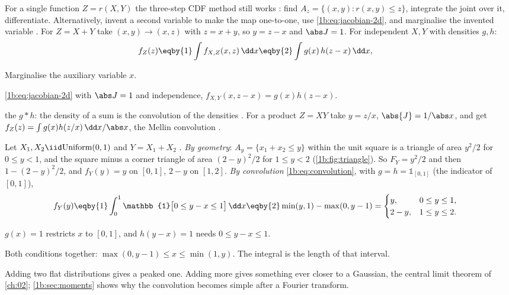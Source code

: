 For a single function $Z=r(X,Y)$ the three-step CDF method still works
: find $A_z=\{(x,y):r(x,y)\le z\}$, integrate the joint over
it, differentiate. Alternatively, invent a second variable to make the map
one-to-one, use \eqref{1b:eq:jacobian-2d}, and marginalise the invented
variable . For $Z=X+Y$ take $(x,y)\to(x,z)$ with
$z=x+y$, so $y=z-x$ and $\abs J=1$. For independent $X,Y$ with densities $g,h$:
\begin{align}
  f_Z(z)
  &\eqby{1} \int f_{X,Z}(x,z)\,\dd x
   \eqby{2} \int g(x)\,h(z-x)\,\dd x ,
  \label{1b:eq:convolution}
\end{align}
\begin{explain}
  \item Marginalise the auxiliary variable $x$.
  \item \eqref{1b:eq:jacobian-2d} with $\abs J=1$ and independence,
        $f_{X,Y}(x,z-x)=g(x)h(z-x)$.
\end{explain}
the  $g*h$: the density of a sum is the convolution of
the densities . For a product $Z=XY$ take $y=z/x$,
$\abs{J}=1/\abs x$, and get $f_Z(z)=\int g(x)h(z/x)\,\dd x/\abs x$, the Mellin
convolution .

\label{1b:ex:triangle}
Let $X_1,X_2\iid\text{Uniform}(0,1)$ and $Y=X_1+X_2$
. \emph{By geometry}: $A_y=\{x_1+x_2\le y\}$ within
the unit square is a triangle of area $y^2/2$ for $0\le y<1$, and the square
minus a corner triangle of area $(2-y)^2/2$ for $1\le y<2$
(\cref{1b:fig:triangle}). So $F_Y=y^2/2$ and then $1-(2-y)^2/2$, and
$f_Y(y)=y$ on $[0,1]$, $2-y$ on $[1,2]$. \emph{By convolution}
\eqref{1b:eq:convolution}, with $g=h=\mathbb{1}_{[0,1]}$ (the indicator of
$[0,1]$),
\begin{align*}
  f_Y(y)
  &\eqby{1} \int_0^1\mathbb{1}\bigl[0\le y-x\le1\bigr]\,\dd x
   \eqby{2} \min(y,1)-\max(0,y-1)
   = \begin{cases}y,&0\le y\le1,\\ 2-y,&1\le y\le2 .\end{cases}
\end{align*}
\begin{explain}
  \item $g(x)=1$ restricts $x$ to $[0,1]$, and $h(y-x)=1$ needs
        $0\le y-x\le1$.
  \item Both conditions together: $\max(0,y-1)\le x\le\min(1,y)$. The
        integral is the length of that interval.
\end{explain}
Adding two flat distributions gives a peaked one. Adding more gives
something ever closer to a Gaussian, the central limit theorem of
\cref{ch:02}; \cref{1b:sec:moments} shows why the convolution becomes simple
after a Fourier transform.

